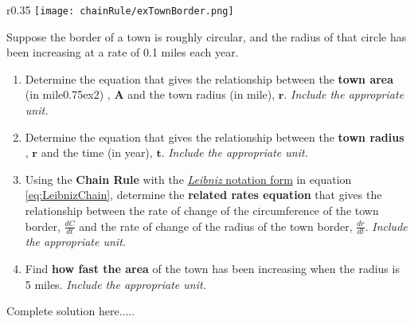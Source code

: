 \begin{wrapfigure}[7]{r}{0.35\textwidth}
\texttt{[image: chainRule/exTownBorder.png]}
\end{wrapfigure}
\hfill \break
\vspace{-0.5in}
\begin{example}
Suppose the border of a town is roughly circular, and the radius of that circle has been increasing at a rate of 0.1 miles each year. 
\renewcommand{\labelenumi}{\textbf{(\alph{enumi})}}
\begin{enumerate}[leftmargin=*]
    \item Determine the equation that gives the relationship between the \textbf{town area} (in mile\raise0.75ex\hbox{\scriptsize{2}}) , $\bm{A}$ and the town radius (in mile), $\bm{r}$. \emph{Include the appropriate unit.} 
\end{enumerate}

\renewcommand{\labelenumi}{\textbf{(\alph{enumi})}}
\begin{enumerate}[leftmargin=*]
    \setcounter{enumi}{1}
    \item Determine the equation that gives the relationship between the \textbf{town radius} , $\bm{r}$ and the time (in year), $\bm{t}$. \emph{Include the appropriate unit.}
    \newpage
    \item Using the \textbf{Chain Rule} with the \underline{\emph{Leibniz} notation form} in equation \ref{eq:LeibnizChain}, determine the \textbf{related rates equation} that gives the relationship between the rate of change of the circumference of the town border, $\displaystyle\frac{dC}{dt}$ and the rate of change of the radius of the town border, $\displaystyle\frac{dr}{dt}$. \emph{Include the appropriate unit.}
    \item Find \textbf{how fast the area} of the town has been increasing when the radius is 5 miles. \emph{Include the appropriate unit.} 
    
\end{enumerate}
    \begin{sol}
    \end{sol}
    \begin{solL}
    Complete solution here.....
    
    \end{solL}
    
\end{example}

